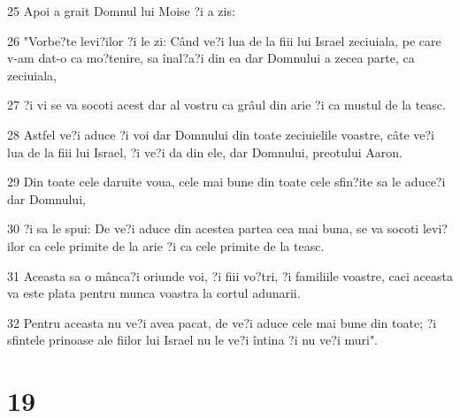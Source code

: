 \par 25 Apoi a grait Domnul lui Moise ?i a zis:
\par 26 "Vorbe?te levi?ilor ?i le zi: Când ve?i lua de la fiii lui Israel zeciuiala, pe care v-am dat-o ca mo?tenire, sa înal?a?i din ea dar Domnului a zecea parte, ca zeciuiala,
\par 27 ?i vi se va socoti acest dar al vostru ca grâul din arie ?i ca mustul de la teasc.
\par 28 Astfel ve?i aduce ?i voi dar Domnului din toate zeciuielile voastre, câte ve?i lua de la fiii lui Israel, ?i ve?i da din ele, dar Domnului, preotului Aaron.
\par 29 Din toate cele daruite voua, cele mai bune din toate cele sfin?ite sa le aduce?i dar Domnului,
\par 30 ?i sa le spui: De ve?i aduce din acestea partea cea mai buna, se va socoti levi?ilor ca cele primite de la arie ?i ca cele primite de la teasc.
\par 31 Aceasta sa o mânca?i oriunde voi, ?i fiii vo?tri, ?i familiile voastre, caci aceasta va este plata pentru munca voastra la cortul adunarii.
\par 32 Pentru aceasta nu ve?i avea pacat, de ve?i aduce cele mai bune din toate; ?i sfintele prinoase ale fiilor lui Israel nu le ve?i întina ?i nu ve?i muri".

\chapter{19}

